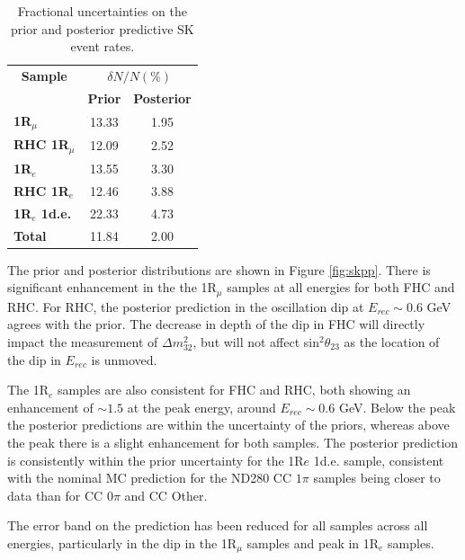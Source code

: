 \begin{center}
\begin{table}
\center
\begin{tabular}{l||c c}
\hline \hline
\multicolumn{1}{c||}{\textbf{Sample}} & \multicolumn{2}{c}{$\delta N/N (\%)$}\\
& \multicolumn{1}{c}{\textbf{Prior}} & \multicolumn{1}{c}{\textbf{Posterior}} \\
\hline\hline
\textbf{1R$_{\mu}$} & 13.33 & 1.95\\
\textbf{RHC 1R$_{\mu}$} & 12.09 & 2.52 \\ 
\textbf{1R$_{e}$} & 13.55 & 3.30\\
\textbf{RHC 1R$_{e}$} & 12.46 & 3.88\\
\textbf{1R$_{e}$ 1d.e.} & 22.33 & 4.73\\ \hline
\textbf{Total} & 11.84 & 2.00\\ \hline\hline
\end{tabular}
\caption{Fractional uncertainties on the prior and posterior predictive SK event rates.}
\label{tab:SKerr}
\end{table}
\end{center}

The prior and posterior distributions are shown in Figure \ref{fig:skpp}. There is significant enhancement in the the 1R$_{\mu}$ samples at all energies for both FHC and RHC. For RHC, the posterior prediction in the oscillation dip at $E_{rec}\sim0.6$ GeV agrees with the prior. The decrease in depth of the dip in FHC will directly impact the measurement of $\Delta m_{32}^2$, but will not affect sin$^{2}\theta_{23}$ as the location of the dip in $E_{rec}$ is unmoved. 

The 1R$_{e}$ samples are also consistent for FHC and RHC, both showing an enhancement of $\sim1.5$ at the peak energy, around $E_{rec}\sim0.6$ GeV. Below the peak the posterior predictions are within the uncertainty of the priors, whereas above the peak there is a slight enhancement for both samples. The posterior prediction is consistently within the prior uncertainty for the 1R$e$ 1d.e. sample, consistent with the nominal MC prediction for the ND280 CC $1\pi$ samples being closer to data than for CC $0\pi$ and CC Other.

The error band on the prediction has been reduced for all samples across all energies, particularly in the dip in the 1R$_{\mu}$ samples and peak in 1R$_{e}$ samples.

